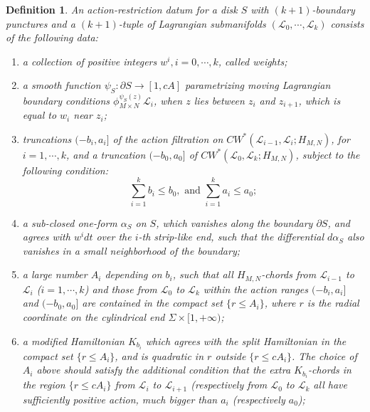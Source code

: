 \documentclass{amsart}
\newtheorem{definition}[theorem]{Definition}
\numberwithin{equation}{section}
\numberwithin{figure}{section}
\begin{document}
\begin{definition} \label{definition of action-restriction datum for punctured disks}
	An action-restriction datum for a disk $S$ with $(k+1)$-boundary punctures and a $(k+1)$-tuple of Lagrangian submanifolds $(\mathcal{L}_{0}, \cdots, \mathcal{L}_{k})$ consists of the following data:
\begin{enumerate}[label=(\roman*)]

\item a collection of positive integers $w^{i}, i=0, \cdots, k$, called weights;

\item a smooth function $\psi_{S}: \partial S \to [1, cA]$ parametrizing moving Lagrangian boundary conditions $\phi_{M \times N}^{\psi_{S}(z)} \mathcal{L}_{i}$, when $z$ lies between $z_{i}$ and $z_{i+1}$, which is equal to $w_{i}$ near $z_{i}$;

\item truncations $(-b_{i}, a_{i}]$ of the action filtration on $CW^{*}(\mathcal{L}_{i-1}, \mathcal{L}_{i}; H_{M, N})$, for $i = 1, \cdots, k$, and a truncation $(-b_{0}, a_{0}]$ of $CW^{*}(\mathcal{L}_{0}, \mathcal{L}_{k}; H_{M, N})$, subject to the following condition:
\begin{equation} \label{action relation}
\sum_{i=1}^{k} b_{i} \le b_{0}, \text{ and }
\sum_{i=1}^{k} a_{i} \le a_{0};
\end{equation}

\item a sub-closed one-form $\alpha_{S}$ on $S$, which vanishes along the boundary $\partial S$, and agrees with $w^{i}dt$ over the $i$-th strip-like end, such that the differential $d\alpha_{S}$ also vanishes in a small neighborhood of the boundary;

\item a large number $A_{i}$ depending on $b_{i}$, such that all $H_{M, N}$-chords from $\mathcal{L}_{i-1}$ to $\mathcal{L}_{i}$ ($i = 1, \cdots, k$) and those from $\mathcal{L}_{0}$ to $\mathcal{L}_{k}$ within the action ranges $(-b_{i}, a_{i}]$ and $(-b_{0}, a_{0}]$ are contained in the compact set $\{ r \le A_{i} \}$, where $r$ is the radial coordinate on the cylindrical end $\Sigma \times [1, +\infty)$;

\item a modified Hamiltonian $K_{b_{i}}$ which agrees with the split Hamiltonian in the compact set $\{r \le A_{i}\}$, and is quadratic in $r$ outside $\{r \le cA_{i}\}$. The choice of $A_{i}$ above should satisfy the additional condition that the extra $K_{b_{i}}$-chords in the region $\{ r \le cA_{i} \}$ from $\mathcal{L}_{i}$ to $\mathcal{L}_{i+1}$ (respectively from $\mathcal{L}_{0}$ to $\mathcal{L}_{k}$ all have sufficiently positive action, much bigger than $a_{i}$ (respectively $a_{0}$);


\end{enumerate}
\end{definition}
\end{document}
